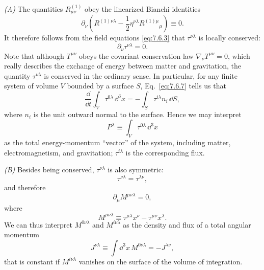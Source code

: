 \medskip
\noindent\textit{(A)} The quantities \(R^{(1)}_{\mu\nu}\) obey the
linearized Bianchi identities
\begin{equation}
  \partial_\nu\left(
    R^{(1)\nu\lambda}
    -\frac12\eta^{\nu\lambda}R^{(1)\mu}{}_\mu
  \right)\equiv0.
  \tag{7.6.6}\label{eq:7.6.6}
\end{equation}
It therefore follows from the field equations \eqref{eq:7.6.3} that
\(\tau^{\nu\lambda}\) is locally conserved:
\begin{equation}
  \partial_\nu\tau^{\nu\lambda}=0.
  \tag{7.6.7}\label{eq:7.6.7}
\end{equation}
Note that although \(T^{\mu\nu}\) obeys the covariant conservation law
\(\nabla_\nu T^{\mu\nu}=0\), which really describes the exchange of energy
between matter and gravitation, the quantity \(\tau^{\nu\lambda}\) is
conserved in the ordinary sense. In particular, for any finite system of
volume \(V\) bounded by a surface \(S\), Eq.~\eqref{eq:7.6.7} tells us that
\begin{equation}
  \frac{\dd}{\dd t}\int_V\tau^{0\lambda}\,\dd^3x
  =
  -\int_S\tau^{i\lambda}n_i\,\dd S,
  \tag{7.6.8}\label{eq:7.6.8}
\end{equation}
where \(n_i\) is the unit outward normal to the surface. Hence we may
interpret
\begin{equation}
  P^\lambda\equiv\int_V\tau^{0\lambda}\,\dd^3x
  \tag{7.6.9}\label{eq:7.6.9}
\end{equation}
as the total energy-momentum ``vector'' of the system, including matter,
electromagnetism, and gravitation; \(\tau^{i\lambda}\) is the corresponding
flux.

\medskip
\noindent\textit{(B)} Besides being conserved,
\(\tau^{\nu\lambda}\) is also symmetric:
\begin{equation}
  \tau^{\nu\lambda}=\tau^{\lambda\nu},
  \tag{7.6.10}\label{eq:7.6.10}
\end{equation}
and therefore
\begin{equation}
  \partial_\mu M^{\mu\nu\lambda}=0,
  \tag{7.6.11}\label{eq:7.6.11}
\end{equation}
where
\begin{equation}
  M^{\mu\nu\lambda}
  \equiv
  \tau^{\mu\lambda}x^\nu-\tau^{\mu\nu}x^\lambda .
  \tag{7.6.12}\label{eq:7.6.12}
\end{equation}
We can thus interpret \(M^{0\nu\lambda}\) and \(M^{i\nu\lambda}\) as the
density and flux of a total angular momentum
\begin{equation}
  J^{\nu\lambda}
  \equiv
  \int\dd^3x\,M^{0\nu\lambda}
  =
  -J^{\lambda\nu},
  \tag{7.6.13}\label{eq:7.6.13}
\end{equation}
that is constant if \(M^{i\nu\lambda}\) vanishes on the surface of the
volume of integration.

